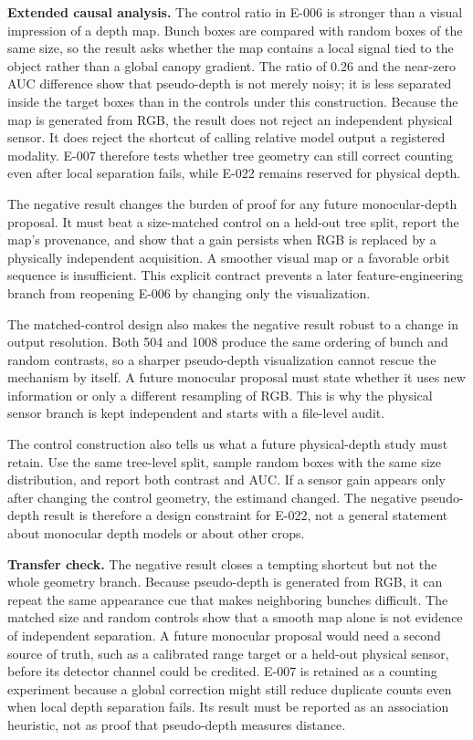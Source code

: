 \documentclass[preprint,12pt]{elsarticle}
\begin{document}
\textbf{Extended causal analysis.} The control ratio in E-006 is stronger
than a visual impression of a depth map. Bunch boxes are compared with random
boxes of the same size, so the result asks whether the map contains a local
signal tied to the object rather than a global canopy gradient. The ratio of
0.26 and the near-zero AUC difference show that pseudo-depth is not merely
noisy; it is less separated inside the target boxes than in the controls under
this construction. Because the map is generated from RGB, the result does
not reject an independent physical sensor. It does reject the shortcut of
calling relative model output a registered modality. E-007 therefore tests
whether tree geometry can still correct counting even after local separation
fails, while E-022 remains reserved for physical depth.

The negative result changes the burden of proof for any future monocular-depth
proposal. It must beat a size-matched control on a held-out tree split, report
the map's provenance, and show that a gain persists when RGB is replaced by a
physically independent acquisition. A smoother visual map or a favorable
orbit sequence is insufficient. This explicit contract prevents a later
feature-engineering branch from reopening E-006 by changing only the
visualization.

The matched-control design also makes the negative result robust to a change
in output resolution. Both 504 and 1008 produce the same ordering of bunch
and random contrasts, so a sharper pseudo-depth visualization cannot rescue
the mechanism by itself. A future monocular proposal must state whether it
uses new information or only a different resampling of RGB. This is why the
physical sensor branch is kept independent and starts with a file-level audit.

The control construction also tells us what a future physical-depth study must
retain. Use the same tree-level split, sample random boxes with the same size
distribution, and report both contrast and AUC. If a sensor gain appears only
after changing the control geometry, the estimand changed. The negative
pseudo-depth result is therefore a design constraint for E-022, not a general
statement about monocular depth models or about other crops.

\textbf{Transfer check.} The negative result closes a tempting shortcut but not
the whole geometry branch. Because pseudo-depth is generated from RGB, it can
repeat the same appearance cue that makes neighboring bunches difficult. The
matched size and random controls show that a smooth map alone is not evidence
of independent separation. A future monocular proposal would need a second
source of truth, such as a calibrated range target or a held-out physical
sensor, before its detector channel could be credited. E-007 is retained as a
counting experiment because a global correction might still reduce duplicate
counts even when local depth separation fails. Its result must be reported as
an association heuristic, not as proof that pseudo-depth measures distance.
\end{document}
